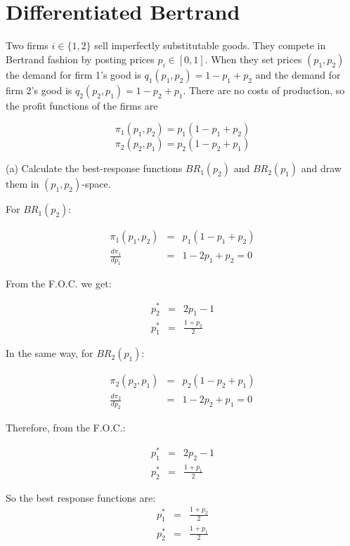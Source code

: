 \section{Differentiated Bertrand}

Two firms $i \in \{1, 2\}$ sell imperfectly substitutable goods. They compete in Bertrand fashion by posting prices $p_i \in [0, 1]$. When they set prices $(p_1, p_2)$ the demand for firm 1’s good is $q_1(p_1, p_2) = 1 - p_1 + p_2$ and the demand for firm 2’s good is $q_2(p_2, p_1) = 1 - p_2 + p_1$. There are no costs of production, so the profit functions of the firms are
    
\[
\pi_1(p_1, p_2) = p_1(1 - p_1 + p_2)
\]
\[
\pi_2(p_2, p_1) = p_2(1 - p_2 + p_1)
\]

\begin{tcolorbox}
(a) Calculate the best-response functions $BR_1(p_2)$ and $BR_2(p_1)$ and draw them in $(p_1, p_2)$-space.
\end{tcolorbox}

For $BR_1(p_2)$:

\begin{eqnarray*}
\pi_1(p_1, p_2) &=& p_1(1 - p_1 + p_2)\\
\frac{d\pi_1}{dp_1} &=& 1 - 2p_1 + p_2 = 0
\end{eqnarray*}

From the F.O.C. we get:

\begin{eqnarray*}
p_2^* &=& 2p_1 - 1\\
p_1^* &=& \frac{1 + p_2}{2}
\end{eqnarray*}

In the same way, for $BR_2(p_1)$:

\begin{eqnarray*}
\pi_2(p_2, p_1) &=& p_2(1 - p_2 + p_1)\\
\frac{d\pi_2}{dp_2} &=& 1 - 2p_2 + p_1 = 0
\end{eqnarray*}

Therefore, from the F.O.C.:

\begin{eqnarray*}
p_1^* &=& 2p_2 - 1\\
p_2^* &=& \frac{1 + p_1}{2}
\end{eqnarray*}

\begin{myanswerbox}
    So the best response functions are:
    \begin{eqnarray*}
        p_1^* &=& \frac{1 + p_2}{2}\\
        p_2^* &=& \frac{1 + p_1}{2}
    \end{eqnarray*}
\end{myanswerbox}

